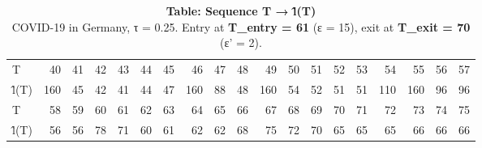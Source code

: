 \begin{table}[t]
\caption*{
{\large \textbf{Table: Sequence T → l̂(T)}} \\ 
{\small COVID-19 in Germany, τ = 0.25. Entry at \textbf{T\_entry = 61} (ε = 15), exit at \textbf{T\_exit = 70} (ε' = 2).}
} 
\begin{tabular*}{\linewidth}{@{\extracolsep{\fill}}lrrrrrrrrrrrrrrrrrr}
\toprule
 &  &  &  &  &  &  &  &  &  &  &  &  &  &  &  &  &  &  \\ 
\midrule\addlinespace[2.5pt]
T & 40 & 41 & 42 & 43 & 44 & 45 & 46 & 47 & 48 & 49 & 50 & 51 & 52 & 53 & 54 & 55 & 56 & 57 \\ 
l̂(T) & 160 & 45 & 42 & 41 & 44 & 47 & 160 & 88 & 48 & 160 & 54 & 52 & 51 & 51 & 110 & 160 & 96 & 96 \\ 
T & 58 & 59 & 60 & 61 & 62 & 63 & 64 & 65 & 66 & 67 & 68 & 69 & 70 & 71 & 72 & 73 & 74 & 75 \\ 
l̂(T) & 56 & 56 & 78 & 71 & 60 & 61 & 62 & 62 & 68 & 75 & 72 & 70 & 65 & 65 & 65 & 66 & 66 & 66 \\ 
\bottomrule
\end{tabular*}
\end{table}

